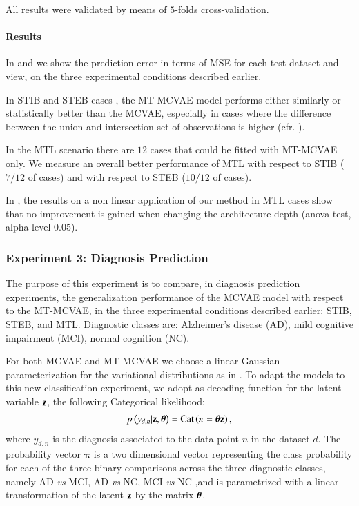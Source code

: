 All results were validated by means of $5$-folds cross-validation.



\paragraph{Results}
In  and  we show the prediction error in terms of MSE for each test dataset and view, on the three experimental conditions described earlier.

In STIB and STEB cases , the MT-MCVAE model performs either similarly or statistically better than the MCVAE, especially in cases where the difference between the union and intersection set of observations is higher (cfr. ).

In the MTL scenario  there are $12$ cases that could be fitted with MT-MCVAE only.
We measure an overall better performance of MTL with respect to STIB ($7/12$ of cases) and with respect to STEB ($10/12$ of cases).

In , the results on a non linear application of our method in MTL cases show
that no improvement is gained when changing the architecture depth (anova test, alpha level $0.05$).

\subsubsection{Experiment 3: Diagnosis Prediction}
\label{ssec:classifier}


The purpose of this experiment is to compare, in diagnosis prediction experiments, the generalization performance of the MCVAE model with respect to the MT-MCVAE,
in the three experimental conditions described earlier: STIB, STEB, and MTL.
%
Diagnostic classes are:
Alzheimer's disease (AD),
mild cognitive impairment (MCI),
normal cognition (NC).

For both MCVAE and MT-MCVAE we choose a linear Gaussian parameterization for the variational distributions as in .
To adapt the models to this new classification experiment, we adopt as decoding function for the latent variable $\mathbf{z}$, the following Categorical likelihood:
\begin{align}
\label{eq:classifier}
p\left(y_{d,n}|\mathbf{z},\boldsymbol{\theta}\right) = \operatorname{Cat}\left(\mathbf{\pi}=\boldsymbol{\theta}\mathbf{z}\right),
\end{align}
where $y_{d,n}$ is the diagnosis associated to the data-point $n$ in the dataset $d$.
The probability vector $\mathbf{\pi}$ is a two dimensional vector representing the class probability for each of the three binary comparisons across the three diagnostic classes, namely AD \textit{vs} MCI, AD \textit{vs} NC, MCI \textit{vs} NC ,and is parametrized with a linear transformation of the latent $\mathbf{z}$ by the matrix $\boldsymbol{\theta}$.

